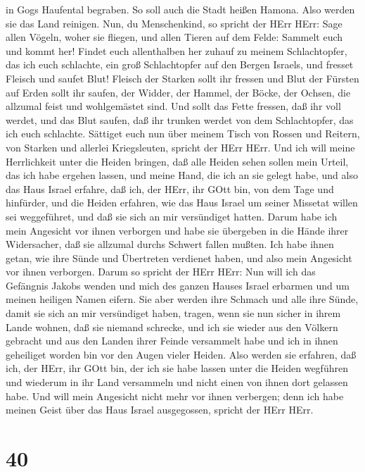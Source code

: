 in Gogs Haufental begraben.  So soll auch die Stadt heißen
Hamona. Also werden sie das Land reinigen.  Nun, du
Menschenkind, so spricht der HErr HErr: Sage allen Vögeln, woher sie
fliegen, und allen Tieren auf dem Felde: Sammelt euch und kommt her!
Findet euch allenthalben her zuhauf zu meinem Schlachtopfer, das ich
euch schlachte, ein groß Schlachtopfer auf den Bergen Israels, und
fresset Fleisch und saufet Blut!  Fleisch der Starken sollt
ihr fressen und Blut der Fürsten auf Erden sollt ihr saufen, der Widder,
der Hammel, der Böcke, der Ochsen, die allzumal feist und wohlgemästet
sind.  Und sollt das Fette fressen, daß ihr voll werdet,
und das Blut saufen, daß ihr trunken werdet von dem Schlachtopfer, das
ich euch schlachte.  Sättiget euch nun über meinem Tisch
von Rossen und Reitern, von Starken und allerlei Kriegsleuten, spricht
der HErr HErr.  Und ich will meine Herrlichkeit unter die
Heiden bringen, daß alle Heiden sehen sollen mein Urteil, das ich habe
ergehen lassen, und meine Hand, die ich an sie gelegt habe,
 und also das Haus Israel erfahre, daß ich, der HErr, ihr
GOtt bin, von dem Tage und hinfürder,  und die Heiden
erfahren, wie das Haus Israel um seiner Missetat willen sei weggeführet,
und daß sie sich an mir versündiget hatten. Darum habe ich mein
Angesicht vor ihnen verborgen und habe sie übergeben in die Hände ihrer
Widersacher, daß sie allzumal durchs Schwert fallen mußten.
 Ich habe ihnen getan, wie ihre Sünde und Übertreten
verdienet haben, und also mein Angesicht vor ihnen verborgen.
 Darum so spricht der HErr HErr: Nun will ich das Gefängnis
Jakobs wenden und mich des ganzen Hauses Israel erbarmen und um meinen
heiligen Namen eifern.  Sie aber werden ihre Schmach und
alle ihre Sünde, damit sie sich an mir versündiget haben, tragen, wenn
sie nun sicher in ihrem Lande wohnen, daß sie niemand schrecke,
 und ich sie wieder aus den Völkern gebracht und aus den
Landen ihrer Feinde versammelt habe und ich in ihnen geheiliget worden
bin vor den Augen vieler Heiden.  Also werden sie erfahren,
daß ich, der HErr, ihr GOtt bin, der ich sie habe lassen unter die
Heiden wegführen und wiederum in ihr Land versammeln und nicht einen von
ihnen dort gelassen habe.  Und will mein Angesicht nicht
mehr vor ihnen verbergen; denn ich habe meinen Geist über das Haus
Israel ausgegossen, spricht der HErr HErr.

\hypertarget{section-39}{%
\section{40}\label{section-39}}

